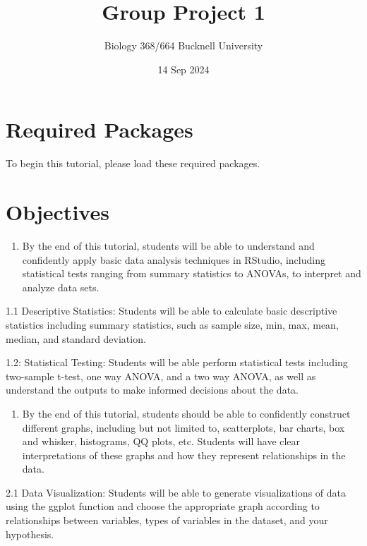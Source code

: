 \documentclass[
]{article}
\title{Group Project 1}
\subtitle{Biology 368/664 Bucknell University}
\author{}
\date{\vspace{-2.5em}14 Sep 2024}
\providecommand{\tightlist}{%
  \setlength{\itemsep}{0pt}\setlength{\parskip}{0pt}}
\begin{document}
\maketitle

\section{Required Packages}\label{required-packages}

To begin this tutorial, please load these required packages.

\section{Objectives}\label{objectives}

\begin{enumerate}
\def\labelenumi{\arabic{enumi}.}
\tightlist
\item
  By the end of this tutorial, students will be able to understand and
  confidently apply basic data analysis techniques in RStudio, including
  statistical tests ranging from summary statistics to ANOVAs, to
  interpret and analyze data sets.
\end{enumerate}

1.1 Descriptive Statistics: Students will be able to calculate basic
descriptive statistics including summary statistics, such as sample
size, min, max, mean, median, and standard deviation.

1.2: Statistical Testing: Students will be able perform statistical
tests including two-sample t-test, one way ANOVA, and a two way ANOVA,
as well as understand the outputs to make informed decisions about the
data.

\begin{enumerate}
\def\labelenumi{\arabic{enumi}.}
\setcounter{enumi}{1}
\tightlist
\item
  By the end of this tutorial, students should be able to confidently
  construct different graphs, including but not limited to,
  scatterplots, bar charts, box and whisker, histograms, QQ plots, etc.
  Students will have clear interpretations of these graphs and how they
  represent relationships in the data.
\end{enumerate}

2.1 Data Visualization: Students will be able to generate visualizations
of data using the ggplot function and choose the appropriate graph
according to relationships between variables, types of variables in the
dataset, and your hypothesis.
\end{document}
